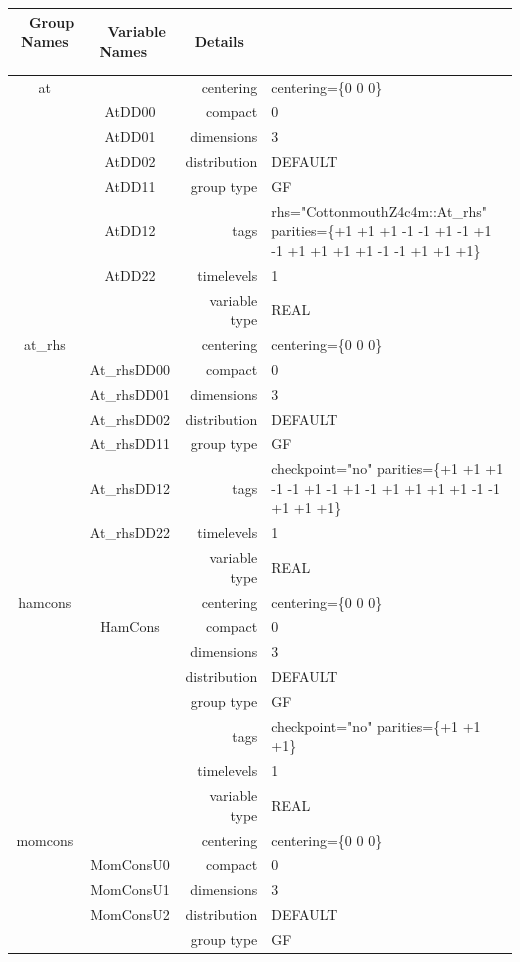 \begin{tabular*}{150mm}{|c|c@{\extracolsep{\fill}}|rl|} \hline 
~ {\bf Group Names} ~ & ~ {\bf Variable Names} ~  &{\bf Details} ~ & ~\\ 
\hline 
at &  & centering & centering=\{0 0 0\} \\ 
 & AtDD00 & compact & 0 \\ 
 & AtDD01 & dimensions & 3 \\ 
 & AtDD02 & distribution & DEFAULT \\ 
 & AtDD11 & group type & GF \\ 
 & AtDD12 & tags & rhs="CottonmouthZ4c4m::At\_rhs" parities=\{+1 +1 +1  -1 -1 +1  -1 +1 -1  +1 +1 +1  +1 -1 -1  +1 +1 +1\} \\ 
 & AtDD22 & timelevels & 1 \\ 
 &  & variable type & REAL \\ 
\hline 
at\_rhs &  & centering & centering=\{0 0 0\} \\ 
 & At\_rhsDD00 & compact & 0 \\ 
 & At\_rhsDD01 & dimensions & 3 \\ 
 & At\_rhsDD02 & distribution & DEFAULT \\ 
 & At\_rhsDD11 & group type & GF \\ 
 & At\_rhsDD12 & tags & checkpoint="no" parities=\{+1 +1 +1  -1 -1 +1  -1 +1 -1  +1 +1 +1  +1 -1 -1  +1 +1 +1\} \\ 
 & At\_rhsDD22 & timelevels & 1 \\ 
 &  & variable type & REAL \\ 
\hline 
hamcons &  & centering & centering=\{0 0 0\} \\ 
 & HamCons & compact & 0 \\ 
 &  & dimensions & 3 \\ 
 &  & distribution & DEFAULT \\ 
 &  & group type & GF \\ 
 &  & tags & checkpoint="no" parities=\{+1 +1 +1\} \\ 
 &  & timelevels & 1 \\ 
 &  & variable type & REAL \\ 
\hline 
momcons &  & centering & centering=\{0 0 0\} \\ 
 & MomConsU0 & compact & 0 \\ 
 & MomConsU1 & dimensions & 3 \\ 
 & MomConsU2 & distribution & DEFAULT \\ 
 &  & group type & GF \\ 

\end{tabular*}
